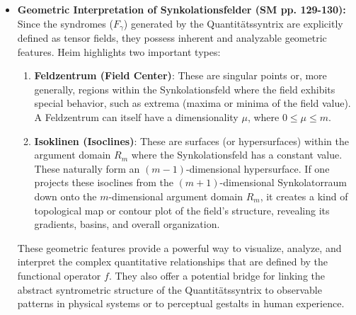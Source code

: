 \documentclass[12pt]{article}
\newcommand{\syndrom}{F} %
\begin{document}
\begin{itemize}
    \item \textbf{Geometric Interpretation of Synkolationsfelder (SM pp. 129-130):}
    Since the syndromes (\(\syndrom_\gamma\)) generated by the Quantitätssyntrix are explicitly defined as tensor fields, they possess inherent and analyzable geometric features. Heim highlights two important types:
    \begin{enumerate}
        \item \textbf{Feldzentrum (Field Center)}: These are singular points or, more generally, regions within the Synkolationsfeld where the field exhibits special behavior, such as extrema (maxima or minima of the field value). A Feldzentrum can itself have a dimensionality \( \mu \), where \( 0 \leq \mu \leq m \).
        \item \textbf{Isoklinen (Isoclines)}: These are surfaces (or hypersurfaces) within the argument domain \( R_m \) where the Synkolationsfeld has a constant value. These naturally form an \((m-1)\)-dimensional hypersurface. If one projects these isoclines from the \( (m+1) \)-dimensional Synkolatorraum down onto the \( m \)-dimensional argument domain \( R_m \), it creates a kind of topological map or contour plot of the field's structure, revealing its gradients, basins, and overall organization.
    \end{enumerate}
    These geometric features provide a powerful way to visualize, analyze, and interpret the complex quantitative relationships that are defined by the functional operator \( f \). They also offer a potential bridge for linking the abstract syntrometric structure of the Quantitätssyntrix to observable patterns in physical systems or to perceptual gestalts in human experience.


\end{itemize}
\end{document}
